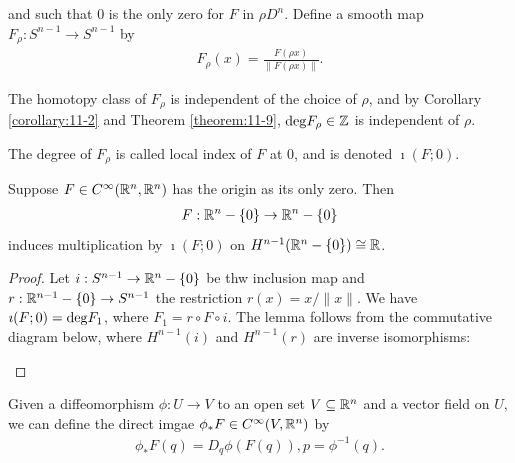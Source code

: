 and such that 0 is the only zero for $F$ in $\rho D^n$. Define a smooth map $F_\rho:S^{n-1}\to S^{n-1}$ 
by 
\begin{align*}
  F_\rho(x) = \frac{F(\rho x)}{\|F(\rho x)\|}.
\end{align*}

The homotopy class of $F_\rho$ is independent of the choice of $\rho$, and by Corollary
\ref{corollary:11-2} and Theorem \ref{theorem:11-9}, $\mathrm{deg}F_\rho\in\mathbb{Z}$ is independent of $\rho$.

\begin{definition}\label{def:11-16}
  The degree of $F_\rho$ is called local index of $F$ at 0, and is denoted $\imath(F; 0)$.
\end{definition}

\begin{lemma}\label{lemma:11-17}
  Suppose $F\in C^\infty(\mathbb{R}^n, \mathbb{R}^n)$ has the origin as its only zero. Then 
  \begin{align*}
    F:\mathbb{R}^n - \{0\}\to \mathbb{R}^n - \{0\}
  \end{align*}
  induces multiplication by $\imath(F; 0)$ on $H^{n-1}(\mathbb{R}^n - \{0\})\cong \mathbb{R}$.
\end{lemma}

\begin{proof}
  Let $i:S^{n-1}\to\mathbb{R}^n-\{0\}$ be thw inclusion map and $r:\mathbb{R}^{n-1}-\{0\}\to S^{n-1}$ the 
  restriction $r(x) = x/\|x\|$. We have $\imath(F; 0) = \mathrm{deg}F_1$, where $F_1 = r\circ F\circ i$.
  The lemma follows from the commutative diagram below, where $H^{n-1}(i)$ and $H^{n-1}(r)$ are inverse 
  isomorphisms:
  \begin{center}
  \end{center}
\end{proof}

Given a diffeomorphism $\phi:U\to V$ to an open set $V\subseteq \mathbb{R}^n$ and a vector field on 
$U$, we can define the direct imgae $\phi_*F \in C^\infty(V, \mathbb{R}^n)$ by 
\begin{align*}
  \phi_*F(q) = D_q\phi(F(q)), p = \phi^{-1}(q).
\end{align*}

